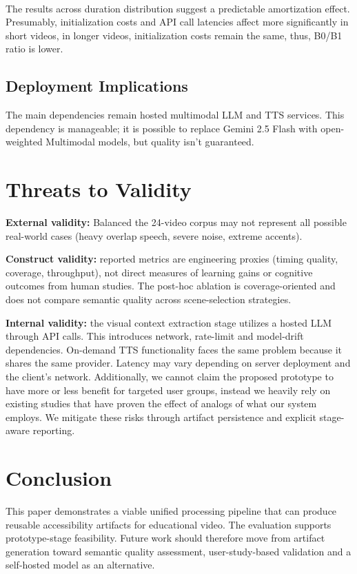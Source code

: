 ﻿﻿\documentclass[conference]{IEEEtran}
\begin{document}
The results across duration distribution suggest a predictable amortization effect. Presumably, initialization costs and API call latencies affect more significantly in short videos, in longer videos, initialization costs remain the same, thus, B0/B1 ratio is lower.

\subsection{Deployment Implications}


The main dependencies remain hosted multimodal LLM and TTS services. This dependency is manageable; it is possible to replace Gemini 2.5 Flash with open-weighted Multimodal models, but quality isn't guaranteed.

\section{Threats to Validity}
\textbf{External validity:} Balanced the 24-video corpus may not represent all possible real-world cases (heavy overlap speech, severe noise, extreme accents).

\textbf{Construct validity:} reported metrics are engineering proxies (timing quality, coverage, throughput), not direct measures of learning gains or cognitive outcomes from human studies. The post-hoc ablation is coverage-oriented and does not compare semantic quality across scene-selection strategies.

\textbf{Internal validity:} the visual context extraction stage utilizes a hosted LLM through API calls. This introduces network, rate-limit and model-drift dependencies. On-demand TTS functionality faces the same problem because it shares the same provider. Latency may vary depending on server deployment and the client's network. Additionally, we cannot claim the proposed prototype to have more or less benefit for targeted user groups, instead we heavily rely on existing studies that have proven the effect of analogs of what our system employs. We mitigate these risks through artifact persistence and explicit stage-aware reporting.

\section{Conclusion}
This paper demonstrates a viable unified processing pipeline that can produce reusable accessibility artifacts for educational video. The evaluation supports prototype-stage feasibility. Future work should therefore move from artifact generation toward semantic quality assessment, user-study-based validation and a self-hosted model as an alternative.



\end{document}
